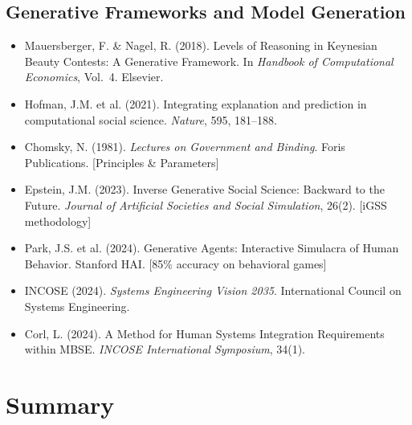 \subsection{Generative Frameworks and Model Generation}
\begin{itemize}[nosep]
\item Mauersberger, F. \& Nagel, R. (2018). Levels of Reasoning in Keynesian Beauty Contests: A Generative Framework. In \textit{Handbook of Computational Economics}, Vol.\ 4. Elsevier.
\item Hofman, J.M. et al. (2021). Integrating explanation and prediction in computational social science. \textit{Nature}, 595, 181--188.
\item Chomsky, N. (1981). \textit{Lectures on Government and Binding}. Foris Publications. [Principles \& Parameters]
\item Epstein, J.M. (2023). Inverse Generative Social Science: Backward to the Future. \textit{Journal of Artificial Societies and Social Simulation}, 26(2). [iGSS methodology]
\item Park, J.S. et al. (2024). Generative Agents: Interactive Simulacra of Human Behavior. Stanford HAI. [85\% accuracy on behavioral games]
\item INCOSE (2024). \textit{Systems Engineering Vision 2035}. International Council on Systems Engineering.
\item Corl, L. (2024). A Method for Human Systems Integration Requirements within MBSE. \textit{INCOSE International Symposium}, 34(1).
\end{itemize}




\section{Summary}
\label{sec:meta-summary}

